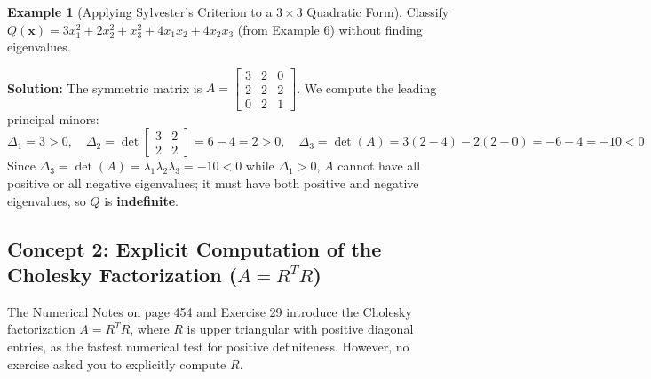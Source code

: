 \documentclass[11pt, letterpaper]{article}
\theoremstyle{definition}
\newtheorem{example}{Example}[section]
\theoremstyle{remark}
\begin{document}
\begin{example}[Applying Sylvester's Criterion to a $3 \times 3$ Quadratic Form]
Classify $Q(\mathbf{x}) = 3x_1^2 + 2x_2^2 + x_3^2 + 4x_1x_2 + 4x_2x_3$ (from Example 6) without finding eigenvalues.

\textbf{Solution:} The symmetric matrix is $A = \begin{bmatrix} 3 & 2 & 0 \\ 2 & 2 & 2 \\ 0 & 2 & 1 \end{bmatrix}$. We compute the leading principal minors:
\[
\Delta_1 = 3 > 0, \quad \Delta_2 = \det \begin{bmatrix} 3 & 2 \\ 2 & 2 \end{bmatrix} = 6 - 4 = 2 > 0, \quad \Delta_3 = \det(A) = 3(2 - 4) - 2(2 - 0) = -6 - 4 = -10 < 0
\]
Since $\Delta_3 = \det(A) = \lambda_1\lambda_2\lambda_3 = -10 < 0$ while $\Delta_1 > 0$, $A$ cannot have all positive or all negative eigenvalues; it must have both positive and negative eigenvalues, so $Q$ is \textbf{indefinite}.
\end{example}

\subsection{Concept 2: Explicit Computation of the Cholesky Factorization ($A = R^T R$)}
The Numerical Notes on page 454 and Exercise 29 introduce the Cholesky factorization $A = R^T R$, where $R$ is upper triangular with positive diagonal entries, as the fastest numerical test for positive definiteness. However, no exercise asked you to explicitly compute $R$.
\end{document}
